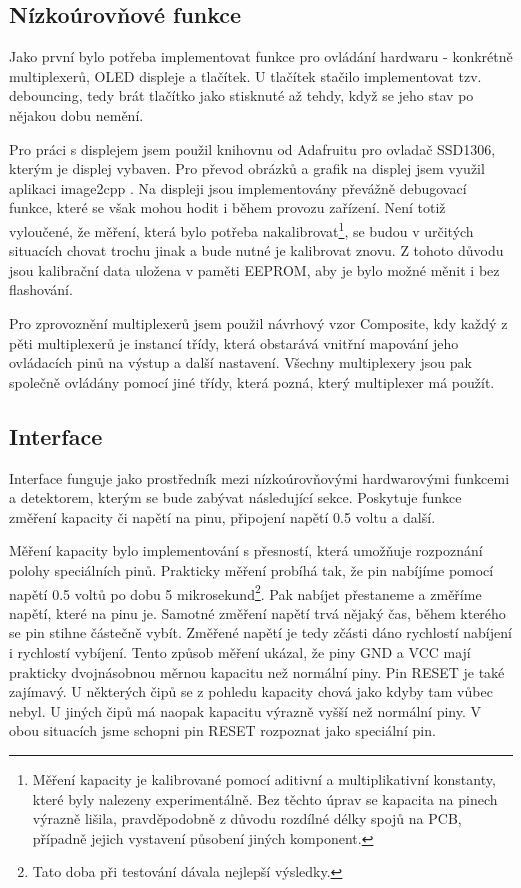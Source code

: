 \documentclass[11pt,a4paper,twoside,openright]{report}
\begin{document}
\subsection {Nízkoúrovňové funkce}

Jako první bylo potřeba implementovat funkce pro ovládání hardwaru - konkrétně multiplexerů, OLED displeje a tlačítek. U tlačítek stačilo implementovat tzv. debouncing, tedy brát tlačítko jako stisknuté až tehdy, když se jeho stav po nějakou dobu nemění.

Pro práci s displejem jsem použil knihovnu od Adafruitu pro ovladač SSD1306, kterým je displej vybaven. Pro převod obrázků a grafik na displej jsem využil aplikaci image2cpp \cite{image2cpp}. Na displeji jsou implementovány převážně debugovací funkce, které se však mohou hodit i během provozu zařízení. Není totiž vyloučené, že měření, která bylo potřeba nakalibrovat\footnote{Měření kapacity je kalibrované pomocí aditivní a multiplikativní konstanty, které byly nalezeny experimentálně. Bez těchto úprav se kapacita na pinech výrazně lišila, pravděpodobně z důvodu rozdílné délky spojů na PCB, případně jejich vystavení působení jiných komponent.}, se budou v určitých situacích chovat trochu jinak a bude nutné je kalibrovat znovu. Z tohoto důvodu jsou kalibrační data uložena v paměti EEPROM, aby je bylo možné měnit i bez flashování.

Pro zprovoznění multiplexerů jsem použil návrhový vzor Composite, kdy každý z pěti multiplexerů je instancí třídy, která obstarává vnitřní mapování jeho ovládacích pinů na výstup a další nastavení. Všechny multiplexery jsou pak společně ovládány pomocí jiné třídy, která pozná, který multiplexer má použít.

\subsection {Interface \label{software:capacitance}}

Interface funguje jako prostředník mezi nízkoúrovňovými hardwarovými funkcemi a detektorem, kterým se bude zabývat následující sekce. Poskytuje funkce změření kapacity či napětí na pinu, připojení napětí 0.5 voltu a další.

Měření kapacity bylo implementování s přesností, která umožňuje rozpoznání polohy speciálních pinů. Prakticky měření probíhá tak, že pin nabíjíme pomocí napětí 0.5 voltů po dobu 5 mikrosekund\footnote{Tato doba při testování dávala nejlepší výsledky.}. Pak nabíjet přestaneme a změříme napětí, které na pinu je. Samotné změření napětí trvá nějaký čas, během kterého se pin stihne částečně vybít. Změřené napětí je tedy zčásti dáno rychlostí nabíjení i rychlostí vybíjení. Tento způsob měření ukázal, že piny GND a VCC mají prakticky dvojnásobnou měrnou kapacitu než normální piny. Pin RESET je také zajímavý. U některých čipů se z pohledu kapacity chová jako kdyby tam vůbec nebyl. U jiných čipů má naopak kapacitu výrazně vyšší než normální piny. V obou situacích jsme schopni pin RESET rozpoznat jako speciální pin.
\end{document}

